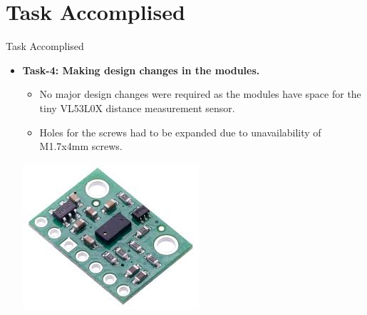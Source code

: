 \documentclass[10pt, a4paper]{beamer}
\begin{document}
\section{Task Accomplised}
\begin{frame}{Task Accomplised}
	\begin{itemize}
		\item \textbf{Task-4: Making design changes in the modules.}
		\begin{itemize}
		    \item No major design changes were required as the modules have space for the tiny VL53L0X distance measurement sensor. 
		    \item Holes for the screws had to be expanded due to unavailability of M1.7x4mm screws.
		\end{itemize}
        \centering\includegraphics[scale=0.45]{download.jpg}
	\end{itemize}
\end{frame}
\end{document}
